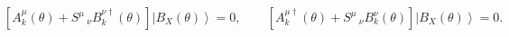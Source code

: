 \begin{equation}
\left[ A_{k}^{\mu}\left( \theta \right) +
S^{\mu}\,\!\!_{\nu}B_{k}^{\nu\dagger }\left( \theta \right)
\right] \left| B_{X}\left( \theta \right) \right\rangle =0,
\qquad
\left[ A_{k}^{\mu\dagger}\left( \theta \right) +
S^{\mu}\,\!\!_{\nu}B_{k}^{\nu }\left( \theta \right)
\right] \left| B_{X}\left( \theta \right) \right\rangle =0.
\end{equation} 
